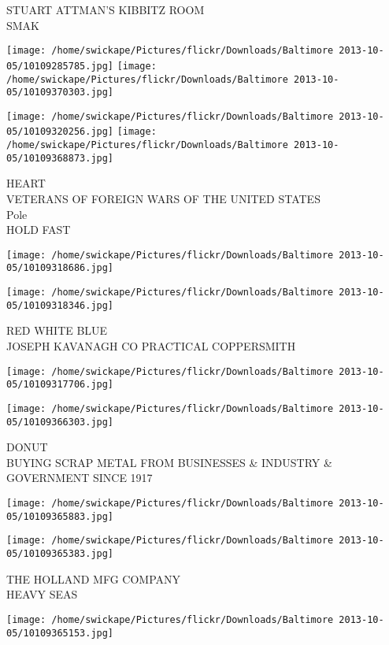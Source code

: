 \documentclass[10pt,letterpaper]{article}
\begin{document}
STUART ATTMAN'S KIBBITZ ROOM\\
SMAK
\pagebreak

\texttt{[image: /home/swickape/Pictures/flickr/Downloads/Baltimore 2013-10-05/10109285785.jpg]}
\texttt{[image: /home/swickape/Pictures/flickr/Downloads/Baltimore 2013-10-05/10109370303.jpg]}

\texttt{[image: /home/swickape/Pictures/flickr/Downloads/Baltimore 2013-10-05/10109320256.jpg]}
\texttt{[image: /home/swickape/Pictures/flickr/Downloads/Baltimore 2013-10-05/10109368873.jpg]}

HEART\\
VETERANS OF FOREIGN WARS OF THE UNITED STATES\\
Pole\\
HOLD FAST
\pagebreak

\texttt{[image: /home/swickape/Pictures/flickr/Downloads/Baltimore 2013-10-05/10109318686.jpg]}

\vspace{0.25in}
\texttt{[image: /home/swickape/Pictures/flickr/Downloads/Baltimore 2013-10-05/10109318346.jpg]}

RED WHITE BLUE\\
JOSEPH KAVANAGH CO PRACTICAL COPPERSMITH
\pagebreak

\texttt{[image: /home/swickape/Pictures/flickr/Downloads/Baltimore 2013-10-05/10109317706.jpg]}

\vspace{0.25in}
\texttt{[image: /home/swickape/Pictures/flickr/Downloads/Baltimore 2013-10-05/10109366303.jpg]}

DONUT\\
BUYING SCRAP METAL FROM BUSINESSES \& INDUSTRY \& GOVERNMENT SINCE 1917
\pagebreak

\texttt{[image: /home/swickape/Pictures/flickr/Downloads/Baltimore 2013-10-05/10109365883.jpg]}

\vspace{0.25in}
\texttt{[image: /home/swickape/Pictures/flickr/Downloads/Baltimore 2013-10-05/10109365383.jpg]}

THE HOLLAND MFG COMPANY\\
HEAVY SEAS
\pagebreak

\texttt{[image: /home/swickape/Pictures/flickr/Downloads/Baltimore 2013-10-05/10109365153.jpg]}
\end{document}
